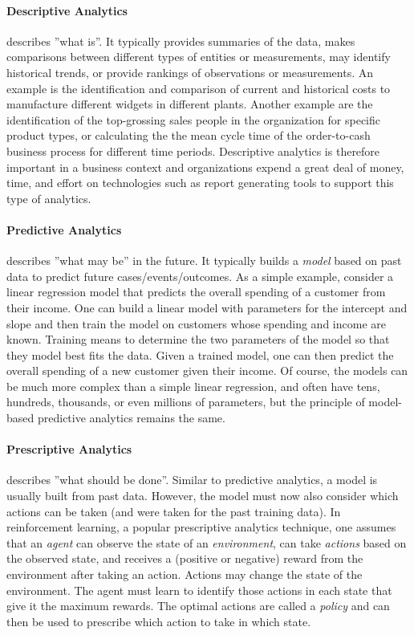 \paragraph*{Descriptive Analytics} describes ''what is''. It typically provides summaries of the data, makes comparisons between different types of entities or measurements, may identify historical trends, or provide rankings of observations or measurements. An example is the identification and comparison of current and historical costs to manufacture different widgets in different plants. Another example are the identification of the top-grossing sales people in the organization for specific product types, or calculating the the mean cycle time of the order-to-cash business process for different time periods. Descriptive analytics is therefore important in a business context and organizations expend a great deal of money, time, and effort on technologies such as report generating tools to support this type of analytics. 

\paragraph*{Predictive Analytics} describes ''what may be'' in the future. It typically builds a \emph{model} based on past data to predict future cases/events/outcomes. As a simple example, consider a linear regression model that predicts the overall spending of a customer from their income. One can build a linear model with parameters for the intercept and slope and then train the model on customers whose spending and income are known. Training means to determine the two parameters of the model so that they model best fits the data. Given a trained model, one can then predict the overall spending of a new customer given their income. Of course, the models can be much more complex than a simple linear regression, and often have tens, hundreds, thousands, or even millions of parameters, but the principle of model-based predictive analytics remains the same.

\paragraph*{Prescriptive Analytics} describes ''what should be done''. Similar to predictive analytics, a model is usually built from  past data. However, the model must now also consider which actions can be taken (and were taken for the past training data). In reinforcement learning, a popular prescriptive analytics technique, one assumes that an \emph{agent} can observe the state of an \emph{environment}, can take \emph{actions} based on the observed state, and receives a (positive or negative) reward from the environment after taking an action. Actions may change the state of the environment. The agent must learn to identify those actions in each state that give it the maximum rewards. The optimal actions are called a \emph{policy} and can then be used to prescribe which action to take in which state.

